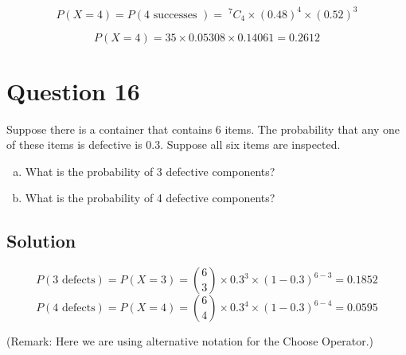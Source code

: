 \documentclass[a4paper,12pt]{article}
\begin{document}
	
	
	
	\[ P(X=4) = P(4 \mbox{ successes }) = \;^7C_4  \times (0.48)^{4} \times (0.52)^{3}\]
	
	\[ P(X=4) = 35 \times 0.05308 \times  0.14061 =  {0.2612} \]
\section*{Question 16}
	Suppose there is a container that contains 6 items.  The probability that any one of these items is defective is 0.3. Suppose all six items are inspected. 
	\begin{enumerate}[(a)]
		\item What is the probability of 3 defective components?
		\item What is the probability of 4 defective components?
	\end{enumerate}
\subsection*{Solution}	
	\[ P(3\text{ defects}) = P(X = 3) = {6\choose 3} \times 0.3^3 \times  (1-0.3)^{6-3} = 0.1852 \]
	\[ P(4\text{ defects})  = P(X = 4) = {6\choose 4}\times 0.3^4\times  (1-0.3)^{6-4} = 0.0595 \]


(Remark: Here we are using alternative notation for the Choose Operator.)
\end{document}
